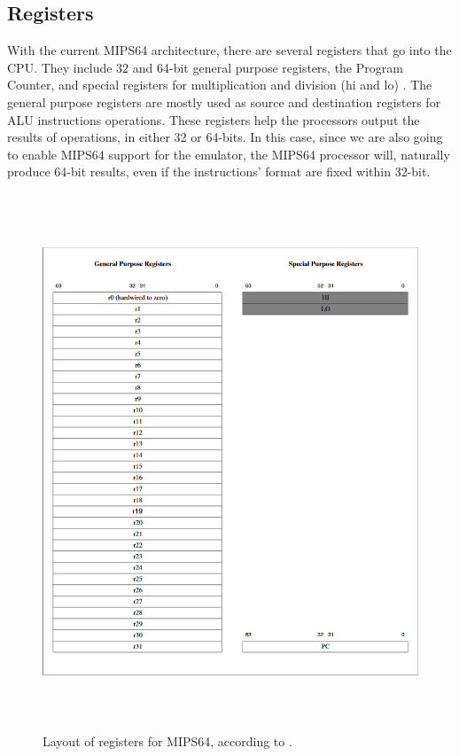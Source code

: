 \documentclass[
    paper=letter,
    parskip=half,
    fontsize=12pt,
    titlepage=firstiscover,
    toc=bibliography,
    numbers=endperiod
]{scrartcl}
\begin{document}
\subsection{Registers}
\label{subsec:mips64-registers}

With the current MIPS64 architecture, there are several registers that
go into the CPU. They include 32 and 64-bit general purpose registers,
the Program Counter, and special registers for multiplication and
division (hi and lo) \cite{mips-specification}. The general purpose
registers are mostly used as source and destination registers for ALU
instructions operations. These registers help the processors output the
results of operations, in either 32 or 64-bits. In this case, since we
are also going to enable MIPS64 support for the emulator, the MIPS64
processor will, naturally produce 64-bit results, even if the
instructions' format are fixed within 32-bit.

\begin{figure}[H]
    \includegraphics[height=16cm]{mips64-register-layout}
    \caption{Layout of registers for MIPS64, according to \protect\cite{mips-specification}.}
\end{figure}
\end{document}
